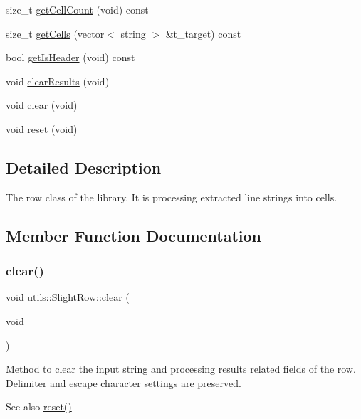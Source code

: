 \begin{DoxyCompactItemize}
\item 
size\+\_\+t \hyperlink{classutils_1_1SlightRow_af7df52464ce8151d7c3c429d0a796c7f}{get\+Cell\+Count} (void) const
\item 
size\+\_\+t \hyperlink{classutils_1_1SlightRow_ab06e2a27035951ff80edf834b430c829}{get\+Cells} (vector$<$ string $>$ \&t\+\_\+target) const
\item 
bool \hyperlink{classutils_1_1SlightRow_a702f97c32ea40303cd83a540404a6eca}{get\+Is\+Header} (void) const
\item 
void \hyperlink{classutils_1_1SlightRow_a44da66b6403cde8ccca9a87cb253ef08}{clear\+Results} (void)
\item 
void \hyperlink{classutils_1_1SlightRow_abd5fa1b875373906c801611a9e051c31}{clear} (void)
\item 
void \hyperlink{classutils_1_1SlightRow_ad323829080b35608b2e5764ed735d4dc}{reset} (void)
\end{DoxyCompactItemize}


\subsection{Detailed Description}
The row class of the library. It is processing extracted line strings into cells. 

\subsection{Member Function Documentation}
\mbox{\label{classutils_1_1SlightRow_abd5fa1b875373906c801611a9e051c31}} 
\subsubsection{\texorpdfstring{clear()}{clear()}}
{\footnotesize\ttfamily void utils\+::\+Slight\+Row\+::clear (\begin{DoxyParamCaption}\item[{void}]{ }\end{DoxyParamCaption})}

Method to clear the input string and processing results related fields of the row. Delimiter and escape character settings are preserved. \begin{DoxySeeAlso}{See also}
\hyperlink{classutils_1_1SlightRow_ad323829080b35608b2e5764ed735d4dc}{reset()} 
\end{DoxySeeAlso}
\mbox{\label{classutils_1_1SlightRow_a44da66b6403cde8ccca9a87cb253ef08}} 
